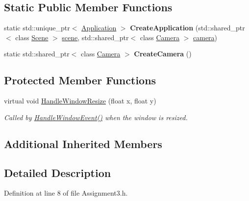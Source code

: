 \subsection*{Static Public Member Functions}
\begin{DoxyCompactItemize}
\item 
\hypertarget{class_assignment3_a12b30bd7b8a0bcefbd977f126ce00b25}{}static std\+::unique\+\_\+ptr$<$ \hyperlink{class_application}{Application} $>$ {\bfseries Create\+Application} (std\+::shared\+\_\+ptr$<$ class \hyperlink{class_scene}{Scene} $>$ \hyperlink{class_application_a88c6615107a5094bb93fa5f153f79554}{scene}, std\+::shared\+\_\+ptr$<$ class \hyperlink{class_camera}{Camera} $>$ \hyperlink{class_application_a0e8589fcb13c520ba472473abe5a518d}{camera})\label{class_assignment3_a12b30bd7b8a0bcefbd977f126ce00b25}

\item 
\hypertarget{class_assignment3_a47d1b58079eee3e135e08768cd2a2461}{}static std\+::shared\+\_\+ptr$<$ class \hyperlink{class_camera}{Camera} $>$ {\bfseries Create\+Camera} ()\label{class_assignment3_a47d1b58079eee3e135e08768cd2a2461}

\end{DoxyCompactItemize}
\subsection*{Protected Member Functions}
\begin{DoxyCompactItemize}
\item 
virtual void \hyperlink{class_assignment3_a851c637c83c8092d8adfb5c9f761daeb}{Handle\+Window\+Resize} (float x, float y)
\begin{DoxyCompactList}\small\item\em Called by \hyperlink{class_application_a74d92db64e051efa56d0357989dcb755}{Handle\+Window\+Event()} when the window is resized. \end{DoxyCompactList}\end{DoxyCompactItemize}
\subsection*{Additional Inherited Members}


\subsection{Detailed Description}


Definition at line 8 of file Assignment3.\+h.



